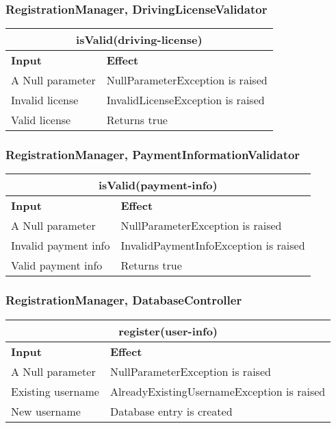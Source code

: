\subsubsection{RegistrationManager, DrivingLicenseValidator}
\begin{tabular}{|p{5cm}|p{7cm}|}
\hline
\multicolumn{2}{|c|}{isValid(driving-license)} \\
\hline
\textbf{Input} & \textbf{Effect} \\

\hline
A Null parameter & NullParameterException is raised \\

\hline
Invalid license & InvalidLicenseException is raised \\

\hline
Valid license & Returns true \\
\hline
\end{tabular}

\subsubsection{RegistrationManager, PaymentInformationValidator}
\begin{tabular}{|p{5cm}|p{7cm}|}
\hline
\multicolumn{2}{|c|}{isValid(payment-info)} \\
\hline
\textbf{Input} & \textbf{Effect} \\

\hline
A Null parameter & NullParameterException is raised \\

\hline
Invalid payment info & InvalidPaymentInfoException is raised \\

\hline
Valid payment info & Returns true \\
\hline
\end{tabular}

\subsubsection{RegistrationManager, DatabaseController}
\begin{tabular}{|p{5cm}|p{7cm}|}
\hline
\multicolumn{2}{|c|}{register(user-info)} \\
\hline
\textbf{Input} & \textbf{Effect} \\

\hline
A Null parameter & NullParameterException is raised \\

\hline
Existing username & AlreadyExistingUsernameException is raised \\

\hline
New username & Database entry is created \\
\hline
\end{tabular}
